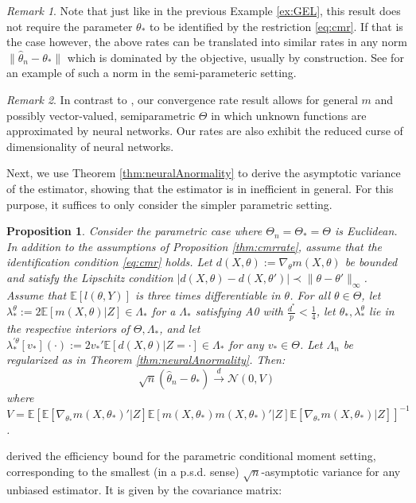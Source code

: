 \documentclass[12pt]{article}
\theoremstyle{myplain}
\newtheorem{proposition}{Proposition}[section]
\theoremstyle{definition}
\theoremstyle{definition}
\theoremstyle{remark}
\newtheorem{remark}{Remark}[section]
\numberwithin{equation}{section}
\begin{document}
\begin{remark}
Note that just like in the previous Example \ref{ex:GEL}, this result does not require the parameter $\theta_*$ to be identified by the restriction \ref{eq:cmr}. If that is the case however, the above rates can be translated into similar rates in any norm $\|\widehat{\theta}_n-\theta_*\|$ which is dominated by the objective, usually by construction. See \cite{aichen2003} for an example of such a norm in the semi-parameteric setting.
\end{remark}
\begin{remark}
In contrast to \cite{dikkala2020minimax}, our convergence rate result allows for general $m$ and possibly vector-valued, semiparametric $\Theta$ in which unknown functions are approximated by neural networks. Our rates are also exhibit the reduced curse of dimensionality of neural networks.
\end{remark}
Next, we use Theorem \ref{thm:neuralAnormality} to derive the asymptotic variance of the estimator, showing that the estimator is in inefficient in general. For this purpose, it suffices to only consider the simpler parametric setting.
\begin{proposition}\label{thm:cmrnormality}
Consider the parametric case where $\Theta_n=\Theta_*=\Theta$ is Euclidean. In addition to the assumptions of Proposition \ref{thm:cmrrate}, assume that the identification condition \ref{eq:cmr} holds. Let $d(X,\theta):=\nabla_\theta m(X,\theta)$ be bounded and satisfy the Lipschitz condition $|d(X,\theta)-d(X,\theta')|\prec \|\theta-\theta'\|_\infty$. Assume that $\mathbb{E}[l(\theta,Y)]$ is three times differentiable in $\theta$. For all $\theta\in\Theta$, let  $\lambda_*^\theta:=2\mathbb{E}[m(X,\theta)|Z]\in\Lambda_*$ for a $\Lambda_*$ satisfying A0 with $\frac{d^*}{p}<\frac{1}{4}$, let $\theta_*,\lambda_*^\theta$ lie in the respective interiors of $\Theta, \Lambda_*$, and let $\lambda_*^{\prime\theta}[v_*](\cdot):=2v_*'\mathbb{E}[d(X,\theta)|Z=\cdot]\in\Lambda_*$ for any $v_*\in\Theta$. Let $\Lambda_n$ be regularized as in Theorem \ref{thm:neuralAnormality}.  Then:
$$\sqrt{n}(\widehat{\theta}_n-\theta_*) \overset{d}{\to}\mathcal{N}(0, V)$$
where $V=\mathbb{E}\left[\mathbb{E}\left[\nabla_{\theta_*}m(X,\theta_*)'|Z\right]\mathbb{E}\left[m(X,\theta_*)m(X,\theta_*)'|Z\right]\mathbb{E}\left[\nabla_{\theta_*}m(X,\theta_*)|Z\right]\right]^{-1}$.
\end{proposition}
\cite{chamberlain1987asymptotic} derived the efficiency bound for the parametric conditional moment setting, corresponding to the smallest (in a p.s.d. sense) $\sqrt{n}$-asymptotic variance for any unbiased estimator. It is given by the covariance matrix:
\end{document}
